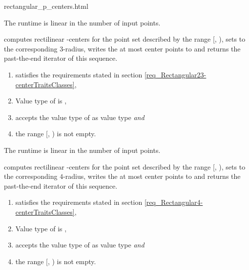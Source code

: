 \begin{ccHtmlClassFile}{rectangular_p_centers.html}
\begin{ccAdvanced}
    \ccImplementation The runtime is linear in the number of input points.
    

    \def\ccLongParamLayout{\ccTrue} 
    
    
    computes rectilinear -centers for the point set described by the
    range [, ), sets  to the corresponding $3$-radius,
    writes the at most  center points to  and returns the
    past-the-end iterator of this sequence.

    \begin{enumerate}
    \item {} satisfies the requirements stated in section
      \ref{req_Rectangular23-centerTraitsClasses},
    \item Value type of  is ,
    \item {} accepts the value type of 
      as value type \textit{and}
    \item the range [, ) is not empty.
    \end{enumerate}
    
    \ccImplementation The runtime is linear in the number of input points.
    

    \def\ccLongParamLayout{\ccTrue} 
    
    
    computes rectilinear -centers for the point set described by the
    range [, ), sets  to the corresponding $4$-radius,
    writes the at most  center points to  and returns the
    past-the-end iterator of this sequence.

    \begin{enumerate}
    \item {} satisfies the requirements stated in section
      \ref{req_Rectangular4-centerTraitsClasses},
    \item Value type of  is ,
    \item {} accepts the value type of 
      as value type \textit{and}
    \item the range [, ) is not empty.
    \end{enumerate}
    

\end{ccAdvanced}
\end{ccHtmlClassFile}
